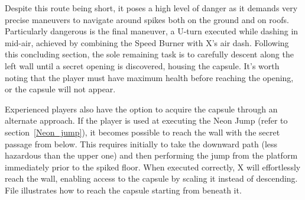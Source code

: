 Despite this route being short, it poses a high level of danger as it  demands very precise maneuvers to navigate around spikes both on the ground and on roofs. Particularly dangerous is the final maneuver, a U-turn executed while dashing in mid-air, achieved by combining the Speed Burner with X's air dash. Following this concluding section, the sole remaining task is to carefully descent along the left wall until a secret opening is discovered, housing the capsule. It's worth noting that the player must have maximum health before reaching the opening, or the capsule will not appear.

Experienced players also have the option to acquire the capsule through an alternate approach. If the player is used at executing the Neon Jump (refer to section~\ref{Neon_jump}), it becomes possible to reach the wall with the secret passage from below. This requires initially to take the downward path (less hazardous than the upper one) and then performing the jump from the platform immediately prior to the spiked floor. When executed correctly, X will effortlessly reach the wall, enabling access to the capsule by scaling it instead of descending. File  illustrates how to reach the capsule starting from beneath it.

